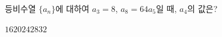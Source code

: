 등비수열 $\{a_n\}$에 대하여 $a_3=8$, $a_8=64a_5$일 때, $a_4$의 값은?
\begin{choices32}{$16$}{$20$}{$24$}{$28$}{$32$}\end{choices32}
